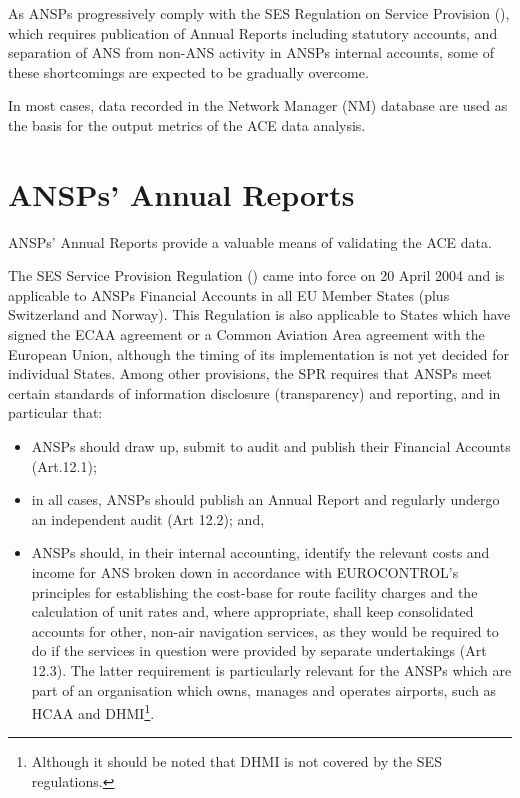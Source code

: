 \documentclass[
  11pt,
  a4paperpaper,
  openany,headsepline=on,footsepline=off,DIV=12,table]{scrbook}
\begin{document}
As ANSPs progressively comply with the SES Regulation on Service
Provision (), which requires publication of Annual
Reports including statutory accounts, and separation of ANS from non-ANS
activity in ANSPs internal accounts, some of these shortcomings are
expected to be gradually overcome.

In most cases, data recorded in the Network Manager (NM) database are
used as the basis for the output metrics of the ACE data analysis.

\section{ANSPs' Annual Reports}\label{sec-annual-report}

ANSPs' Annual Reports provide a valuable means of validating the ACE
data.

The SES Service Provision Regulation
() came into force on 20 April 2004 and is applicable
to ANSPs Financial Accounts in all EU Member States (plus Switzerland
and Norway). This Regulation is also applicable to States which have
signed the ECAA agreement or a Common Aviation Area agreement with the
European Union, although the timing of its implementation is not yet
decided for individual States. Among other provisions, the SPR requires
that ANSPs meet certain standards of information disclosure
(transparency) and reporting, and in particular that:

\begin{itemize}
\item
  ANSPs should draw up, submit to audit and publish their Financial
  Accounts (Art.12.1);
\item
  in all cases, ANSPs should publish an Annual Report and regularly
  undergo an independent audit (Art 12.2); and,
\item
  ANSPs should, in their internal accounting, identify the relevant
  costs and income for ANS broken down in accordance with EUROCONTROL's
  principles for establishing the cost-base for route facility charges
  and the calculation of unit rates and, where appropriate, shall keep
  consolidated accounts for other, non-air navigation services, as they
  would be required to do if the services in question were provided by
  separate undertakings (Art 12.3). The latter requirement is
  particularly relevant for the ANSPs which are part of an organisation
  which owns, manages and operates airports, such as HCAA and
  DHMI\footnote{Although it should be noted that DHMI is not covered by
    the SES regulations.}.
\end{itemize}
\end{document}
